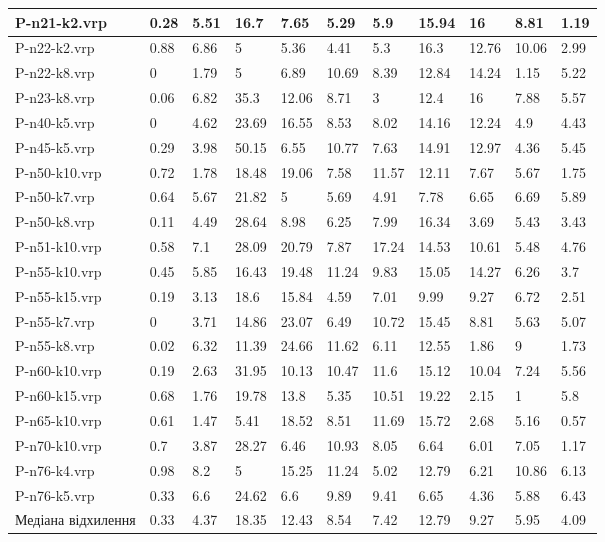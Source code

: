 \begin{table}[!ht]
\begin{tabular}{|l|l|l|l|l|l|l|l|l|l|l|}
        P-n21-k2.vrp & 0.28 & 5.51 & 16.7 & 7.65 & 5.29 & 5.9 & 15.94 & 16 & 8.81 & 1.19 \\ \hline
        P-n22-k2.vrp & 0.88 & 6.86 & 5 & 5.36 & 4.41 & 5.3 & 16.3 & 12.76 & 10.06 & 2.99 \\ \hline
        P-n22-k8.vrp & 0 & 1.79 & 5 & 6.89 & 10.69 & 8.39 & 12.84 & 14.24 & 1.15 & 5.22 \\ \hline
        P-n23-k8.vrp & 0.06 & 6.82 & 35.3 & 12.06 & 8.71 & 3 & 12.4 & 16 & 7.88 & 5.57 \\ \hline
        P-n40-k5.vrp & 0 & 4.62 & 23.69 & 16.55 & 8.53 & 8.02 & 14.16 & 12.24 & 4.9 & 4.43 \\ \hline
        P-n45-k5.vrp & 0.29 & 3.98 & 50.15 & 6.55 & 10.77 & 7.63 & 14.91 & 12.97 & 4.36 & 5.45 \\ \hline
        P-n50-k10.vrp & 0.72 & 1.78 & 18.48 & 19.06 & 7.58 & 11.57 & 12.11 & 7.67 & 5.67 & 1.75 \\ \hline
        P-n50-k7.vrp & 0.64 & 5.67 & 21.82 & 5 & 5.69 & 4.91 & 7.78 & 6.65 & 6.69 & 5.89 \\ \hline
        P-n50-k8.vrp & 0.11 & 4.49 & 28.64 & 8.98 & 6.25 & 7.99 & 16.34 & 3.69 & 5.43 & 3.43 \\ \hline
        P-n51-k10.vrp & 0.58 & 7.1 & 28.09 & 20.79 & 7.87 & 17.24 & 14.53 & 10.61 & 5.48 & 4.76 \\ \hline
        P-n55-k10.vrp & 0.45 & 5.85 & 16.43 & 19.48 & 11.24 & 9.83 & 15.05 & 14.27 & 6.26 & 3.7 \\ \hline
        P-n55-k15.vrp & 0.19 & 3.13 & 18.6 & 15.84 & 4.59 & 7.01 & 9.99 & 9.27 & 6.72 & 2.51 \\ \hline
        P-n55-k7.vrp & 0 & 3.71 & 14.86 & 23.07 & 6.49 & 10.72 & 15.45 & 8.81 & 5.63 & 5.07 \\ \hline
        P-n55-k8.vrp & 0.02 & 6.32 & 11.39 & 24.66 & 11.62 & 6.11 & 12.55 & 1.86 & 9 & 1.73 \\ \hline
        P-n60-k10.vrp & 0.19 & 2.63 & 31.95 & 10.13 & 10.47 & 11.6 & 15.12 & 10.04 & 7.24 & 5.56 \\ \hline
        P-n60-k15.vrp & 0.68 & 1.76 & 19.78 & 13.8 & 5.35 & 10.51 & 19.22 & 2.15 & 1 & 5.8 \\ \hline
        P-n65-k10.vrp & 0.61 & 1.47 & 5.41 & 18.52 & 8.51 & 11.69 & 15.72 & 2.68 & 5.16 & 0.57 \\ \hline
        P-n70-k10.vrp & 0.7 & 3.87 & 28.27 & 6.46 & 10.93 & 8.05 & 6.64 & 6.01 & 7.05 & 1.17 \\ \hline
        P-n76-k4.vrp & 0.98 & 8.2 & 5 & 15.25 & 11.24 & 5.02 & 12.79 & 6.21 & 10.86 & 6.13 \\ \hline
        P-n76-k5.vrp & 0.33 & 6.6 & 24.62 & 6.6 & 9.89 & 9.41 & 6.65 & 4.36 & 5.88 & 6.43 \\ \hline
        Медіана відхилення & 0.33 & 4.37 & 18.35 & 12.43 & 8.54 & 7.42 & 12.79 & 9.27 & 5.95 & 4.09 \\ \hline
    \end{tabular}
\end{table}